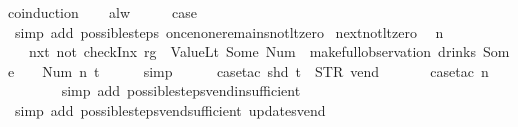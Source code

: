 \begin{isabellebody}
%
\isadelimproof
%
\endisadelimproof
%
\isatagproof
{}\isamarkupfalse%
{\isacharparenleft}coinduction{\isacharparenright}\isanewline
\ \ \isamarkupfalse%
\ alw\isanewline
\ \ \isamarkupfalse%
\ \isamarkupfalse%
\ {\isacharquery}case\isanewline
\ \ \ \ \isamarkupfalse%
\ {\isacharparenleft}simp\ add{\isacharcolon}\ possible{\isacharunderscore}steps{\isacharunderscore}{}\ once{\isacharunderscore}none{\isacharunderscore}remains{\isacharunderscore}not{\isacharunderscore}lt{\isacharunderscore}zero{\isacharparenright}\isanewline
{}\isamarkupfalse%
%
\endisatagproof
{\isafoldproof}%
%
\isadelimproof
\isanewline
%
\endisadelimproof
\isanewline
{}\isamarkupfalse%
\ next{\isacharunderscore}not{\isacharunderscore}lt{\isacharunderscore}zero{\isacharcolon}\isanewline
\ \ {\isachardoublequoteopen}n\ {\isasymge}\ {}\ {\isasymLongrightarrow}\isanewline
\ \ \ {\isacharparenleft}nxt\ {\isacharparenleft}not\ {\isacharparenleft}checkInx\ rg\ {}\ ValueLt\ {\isacharparenleft}Some\ {\isacharparenleft}Num\ {}{\isacharparenright}{\isacharparenright}{\isacharparenright}{\isacharparenright}{\isacharparenright}\ {\isacharparenleft}make{\isacharunderscore}full{\isacharunderscore}observation\ drinks\ {\isacharparenleft}Some\ {}{\isacharparenright}\ {\isacharless}{}\ {\isacharcolon}{\isacharequal}\ Num\ n{\isachargreater}\ t{\isacharparenright}{\isachardoublequoteclose}\isanewline
%
\isadelimproof
\ \ \ \ %
\endisadelimproof
%
\isatagproof
{}\isamarkupfalse%
\ simp\isanewline
\ \ \ \ \isamarkupfalse%
\ {\isacharparenleft}case{\isacharunderscore}tac\ {\isachardoublequoteopen}shd\ t\ {\isacharequal}\ {\isacharparenleft}STR\ {\isacharprime}{\isacharprime}vend{\isacharprime}{\isacharprime}{\isacharcomma}\ {\isacharbrackleft}{\isacharbrackright}{\isacharparenright}{\isachardoublequoteclose}{\isacharparenright}\isanewline
\ \ \ \ \isamarkupfalse%
\ {\isacharparenleft}case{\isacharunderscore}tac\ {\isachardoublequoteopen}n\ {\isacharequal}\ {}{\isachardoublequoteclose}{\isacharparenright}\isanewline
\ \ \ \ \ \ \isamarkupfalse%
\ {\isacharparenleft}simp\ add{\isacharcolon}\ possible{\isacharunderscore}steps{\isacharunderscore}vend{\isacharunderscore}insufficient{\isacharparenright}\isanewline
\ \ \ \ \ \isamarkupfalse%
\ {\isacharparenleft}simp\ add{\isacharcolon}\ possible{\isacharunderscore}steps{\isacharunderscore}vend{\isacharunderscore}sufficient\ updates{\isacharunderscore}vend{\isacharparenright}\isanewline

\end{isabellebody}
